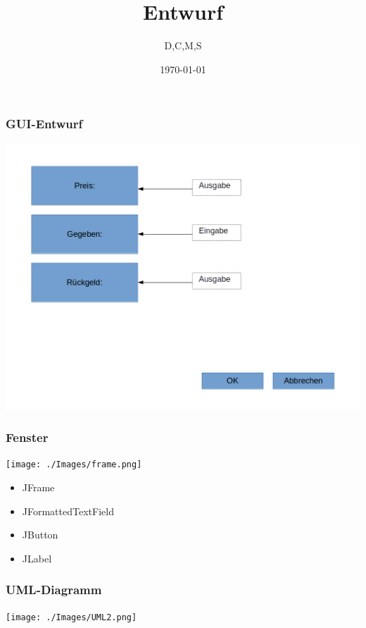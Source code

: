 \documentclass{beamer}
\author{D,C,M,S}
\title{Entwurf}
\date{\today}
\begin{document}

\begin{frame}
	\frametitle{GUI-Entwurf}
	\begin{center}
		\includegraphics[width=0.7\linewidth]{./Images/UI-Entwurf.png}
	\end{center}
\end{frame}

\begin{frame}
	\frametitle{Fenster}
	\begin{minipage}{0.49\linewidth}
		\texttt{[image: ./Images/frame.png]}
	\end{minipage}
		\hfill
		\begin{minipage}{0.5\linewidth}
			\begin{itemize}
				\item JFrame
				\item JFormattedTextField
				\item JButton
				\item JLabel
			\end{itemize}
	\end{minipage}	
\end{frame}

\begin{frame}
	\frametitle{UML-Diagramm}
	\begin{center}
		\texttt{[image: ./Images/UML2.png]}
	\end{center}
\end{frame}
\end{document}
